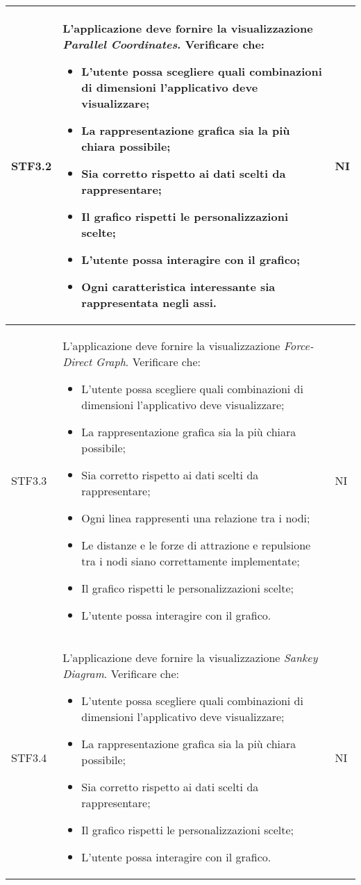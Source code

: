 \begin{longtable}{|p{1.5cm}|p{11cm}|p{1cm}|}
        STF3.2 & L'applicazione deve fornire la visualizzazione  \textit{Parallel Coordinates}. Verificare che: \begin{itemize}
            \item L'utente possa scegliere quali combinazioni di dimensioni l'applicativo deve visualizzare;
            \item La rappresentazione grafica sia la più chiara possibile;
            \item Sia corretto rispetto ai dati scelti da rappresentare;
            \item Il grafico rispetti le personalizzazioni scelte;
            \item L'utente possa interagire con il grafico;
            \item Ogni caratteristica interessante sia rappresentata negli assi.
        \end{itemize} & NI\\ \hline

        STF3.3 & L'applicazione deve fornire la visualizzazione  \textit{Force-Direct Graph}. Verificare che: \begin{itemize}
            \item L'utente possa scegliere quali combinazioni di dimensioni l'applicativo deve visualizzare;
            \item La rappresentazione grafica sia la più chiara possibile;
            \item Sia corretto rispetto ai dati scelti da rappresentare;
            \item Ogni linea rappresenti una relazione tra i nodi;
            \item Le distanze e le forze di attrazione e repulsione tra i nodi siano correttamente implementate;
            \item Il grafico rispetti le personalizzazioni scelte;
            \item L'utente possa interagire con il grafico.
        \end{itemize} & NI\\ \hline

        STF3.4 & L'applicazione deve fornire la visualizzazione  \textit{Sankey Diagram}. Verificare che: \begin{itemize}
            \item L'utente possa scegliere quali combinazioni di dimensioni l'applicativo deve visualizzare;
            \item La rappresentazione grafica sia la più chiara possibile;
            \item Sia corretto rispetto ai dati scelti da rappresentare;
            \item Il grafico rispetti le personalizzazioni scelte;
            \item L'utente possa interagire con il grafico.
        \end{itemize} & NI\\ \hline


\end{longtable}
